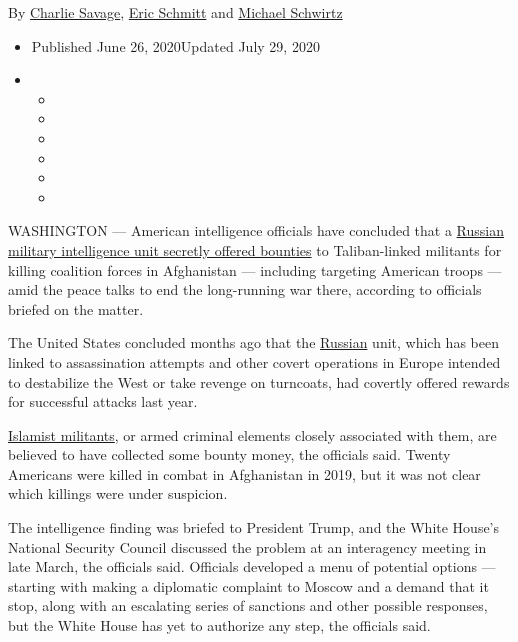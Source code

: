 By \href{https://www.nytimes.com/by/charlie-savage}{Charlie Savage},
\href{https://www.nytimes.com/by/eric-schmitt}{Eric Schmitt} and
\href{https://www.nytimes.com/by/michael-schwirtz}{Michael Schwirtz}

\begin{itemize}
\item
  Published June 26, 2020Updated July 29, 2020
\item
  \begin{itemize}
  \item
  \item
  \item
  \item
  \item
  \item
  \end{itemize}
\end{itemize}

WASHINGTON --- American intelligence officials have concluded that a
\href{https://www.nytimes.com/2020/07/29/us/politics/trump-putin-bounties.html}{Russian
military intelligence unit secretly offered bounties} to Taliban-linked
militants for killing coalition forces in Afghanistan --- including
targeting American troops --- amid the peace talks to end the
long-running war there, according to officials briefed on the matter.

The United States concluded months ago that the
\href{https://www.nytimes.com/2020/06/29/us/politics/trump-russia-plot-afghanistan.html}{Russian}
unit, which has been linked to assassination attempts and other covert
operations in Europe intended to destabilize the West or take revenge on
turncoats, had covertly offered rewards for successful attacks last
year.

\href{https://www.nytimes.com/2020/06/29/us/politics/trump-russia-plot-afghanistan.html}{Islamist
militants}, or armed criminal elements closely associated with them, are
believed to have collected some bounty money, the officials said. Twenty
Americans were killed in combat in Afghanistan in 2019, but it was not
clear which killings were under suspicion.

The intelligence finding was briefed to President Trump, and the White
House's National Security Council discussed the problem at an
interagency meeting in late March, the officials said. Officials
developed a menu of potential options --- starting with making a
diplomatic complaint to Moscow and a demand that it stop, along with an
escalating series of sanctions and other possible responses, but the
White House has yet to authorize any step, the officials said.

